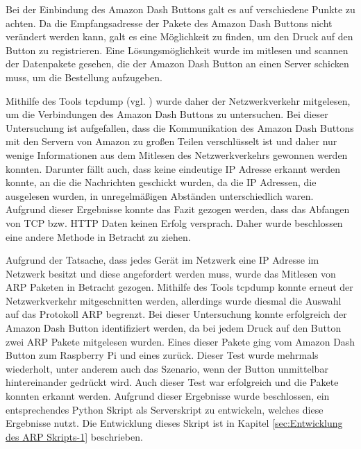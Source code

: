 Bei der Einbindung des Amazon Dash Buttons galt es auf verschiedene Punkte zu achten. 
Da die Empfangsadresse der Pakete des Amazon Dash Buttons nicht verändert werden kann, galt es eine Möglichkeit zu finden, um den Druck auf den Button zu registrieren.
Eine Lösungsmöglichkeit wurde im mitlesen und scannen der Datenpakete gesehen, die der Amazon Dash Button an einen Server schicken muss, um die Bestellung aufzugeben.

Mithilfe des Tools tcpdump (vgl. \cite{.tcpdump}) wurde daher der Netzwerkverkehr mitgelesen, um die Verbindungen des Amazon Dash Buttons zu untersuchen. 
Bei dieser Untersuchung ist aufgefallen, dass die Kommunikation des Amazon Dash Buttons mit den Servern von Amazon zu großen Teilen verschlüsselt ist und daher nur wenige Informationen aus dem Mitlesen des Netzwerkverkehrs gewonnen werden konnten. 
Darunter fällt auch, dass keine eindeutige \ac{IP} Adresse erkannt werden konnte, an die die Nachrichten geschickt wurden, da die \ac{IP} Adressen, die ausgelesen wurden, in unregelmäßigen Abständen unterschiedlich waren.
Aufgrund dieser Ergebnisse konnte das Fazit gezogen werden, dass das Abfangen von \ac{TCP} bzw. \ac{HTTP} Daten keinen Erfolg versprach.
Daher wurde beschlossen eine andere Methode in Betracht zu ziehen.

Aufgrund der Tatsache, dass jedes Gerät im Netzwerk eine \ac{IP} Adresse im Netzwerk besitzt und diese angefordert werden muss, wurde das Mitlesen von \ac{ARP} Paketen in Betracht gezogen.
Mithilfe des Tools tcpdump konnte erneut der Netzwerkverkehr mitgeschnitten werden, allerdings wurde diesmal die Auswahl auf das Protokoll \ac{ARP} begrenzt. 
Bei dieser Untersuchung konnte erfolgreich der Amazon Dash Button identifiziert werden, da bei jedem Druck auf den Button zwei \ac{ARP} Pakete mitgelesen wurden.
Eines dieser Pakete ging vom Amazon Dash Button zum Raspberry Pi und eines zurück. 
Dieser Test wurde mehrmals wiederholt, unter anderem auch das Szenario, wenn der Button unmittelbar hintereinander gedrückt wird. 
Auch dieser Test war erfolgreich und die Pakete konnten erkannt werden.
Aufgrund dieser Ergebnisse wurde beschlossen, ein entsprechendes Python Skript als Serverskript zu entwickeln, welches diese Ergebnisse nutzt.
Die Entwicklung dieses Skript ist in Kapitel \ref{sec:Entwicklung des ARP Skripts-1} beschrieben. 